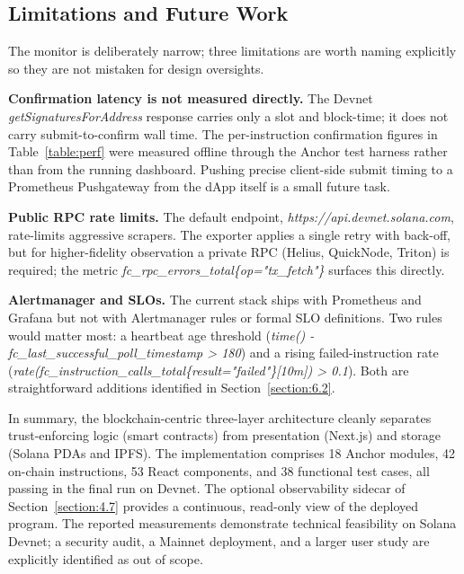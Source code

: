 \subsection{Limitations and Future Work}
\label{subsection:4.7.6}

The monitor is deliberately narrow; three limitations are worth naming explicitly so they are not mistaken for design oversights.

\textbf{Confirmation latency is not measured directly.} The Devnet \emph{getSignaturesForAddress} response carries only a slot and block-time; it does not carry submit-to-confirm wall time. The per-instruction confirmation figures in Table~\ref{table:perf} were measured offline through the Anchor test harness rather than from the running dashboard. Pushing precise client-side submit timing to a Prometheus Pushgateway from the dApp itself is a small future task.

\textbf{Public RPC rate limits.} The default endpoint, \emph{https://api.devnet.solana.com}, rate-limits aggressive scrapers. The exporter applies a single retry with back-off, but for higher-fidelity observation a private RPC (Helius, QuickNode, Triton) is required; the metric \emph{fc\_rpc\_errors\_total\{op="tx\_fetch"\}} surfaces this directly.

\textbf{Alertmanager and SLOs.} The current stack ships with Prometheus and Grafana but not with Alertmanager rules or formal SLO definitions. Two rules would matter most: a heartbeat age threshold (\emph{time() - fc\_last\_successful\_poll\_timestamp \textgreater{} 180}) and a rising failed-instruction rate (\emph{rate(fc\_instruction\_calls\_total\{result="failed"\}[10m]) \textgreater{} 0.1}). Both are straightforward additions identified in Section~\ref{section:6.2}.

\medskip

In summary, the blockchain-centric three-layer architecture cleanly separates trust-enforcing logic (smart contracts) from presentation (Next.js) and storage (Solana PDAs and IPFS). The implementation comprises 18 Anchor modules, 42 on-chain instructions, 53 React components, and 38 functional test cases, all passing in the final run on Devnet. The optional observability sidecar of Section~\ref{section:4.7} provides a continuous, read-only view of the deployed program. The reported measurements demonstrate technical feasibility on Solana Devnet; a security audit, a Mainnet deployment, and a larger user study are explicitly identified as out of scope.
